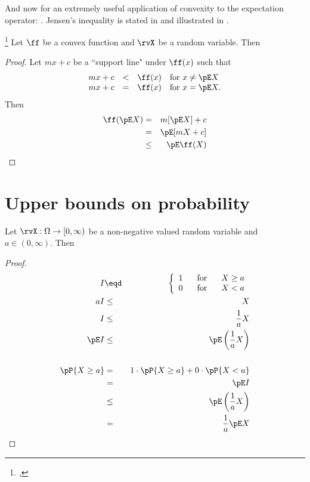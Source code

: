 And now for an extremely useful application of convexity to the
expectation operator: .
Jensen's inequality is stated in 
and illustrated in .
\begin{theorem}
\footnote{
  ,
  }
\label{thm:jensen}
Let $\ff$ be a convex function and $\rvX$ be a random variable. Then
\end{theorem}
\begin{proof}
Let $mx+c$ be a ``support line" under $\ff(x)$ such that
\[
  \begin{array}{rcll}
    mx+c &<& \ff(x) & \mbox{for } x\ne \pE X \\
    mx+c &=& \ff(x) & \mbox{for } x=\pE X.
  \end{array}
\]
Then
\begin{eqnarray*}
  \ff(\pE X)
    &=&   m[\pE X] + c
  \\&=&   \pE[mX + c]
  \\&\le& \pE\ff(X)
\end{eqnarray*}
\end{proof}


\section{Upper bounds on probability}
\begin{theorem}
Let $\rvX:\Omega\to[0,\infty)$ be a non-negative valued random variable and
$a\in(0,\infty)$. Then
\end{theorem}
\begin{proof}
\begin{eqnarray*}
  I &\eqd& \left\{ \begin{array}{l@{\hspace{4ex}\mbox{for}\hspace{4ex}}l}
    1 & X\ge a \\
    0 & X < a
    \end{array}\right.
\\
  aI &\le& X           \\
   I &\le& \frac{1}{a} X \\
   \pE I &\le& \pE\left(\frac{1}{a} X\right) \\
\\
   \pP{X\ge a}
     &=& 1\cdot\pP{X\ge a} + 0\cdot\pP{X<a}
   \\&=& \pE I
   \\&\le& \pE\left(\frac{1}{a} X \right)
   \\&=&   \frac{1}{a}\pE X
\end{eqnarray*}
\end{proof}


